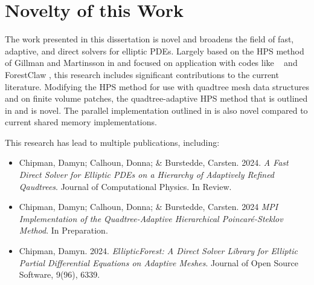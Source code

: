 \section{Novelty of this Work}

The work presented in this dissertation is novel and broadens the field of fast, adaptive, and direct solvers for elliptic PDEs. Largely based on the HPS method of Gillman and Martinsson in \citep{gillman2014direct,martinsson2019fast} and focused on application with codes like \pforest\ \citep{burstedde2011p4est,burstedde2020parallel} and ForestClaw \citep{calhoun2017forestclaw}, this research includes significant contributions to the current literature. Modifying the HPS method for use with quadtree mesh data structures and on finite volume patches, the quadtree-adaptive HPS method that is outlined in  and  is novel. The parallel implementation outlined in  is also novel compared to current shared memory implementations.

This research has lead to multiple publications, including:
\begin{itemize}
    \item{Chipman, Damyn; Calhoun, Donna; \& Burstedde, Carsten. 2024. {\em A Fast Direct Solver for Elliptic PDEs on a Hierarchy of Adaptively Refined Qaudtrees}. Journal of Computational Physics. In Review.}
    \item{Chipman, Damyn; Calhoun, Donna; \& Burstedde, Carsten. 2024 {\em MPI Implementation of the Quadtree-Adaptive Hierarchical Poincar\'e-Steklov Method}. In Preparation.}
    \item{Chipman, Damyn. 2024. {\em EllipticForest: A Direct Solver Library for Elliptic Partial Differential Equations on Adaptive Meshes}. Journal of Open Source Software, 9(96), 6339.}
\end{itemize}